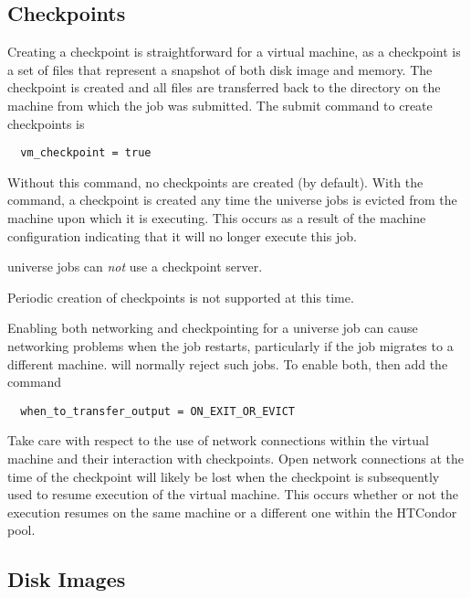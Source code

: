 \subsection{\label{sec:vm-checkpoints}Checkpoints}

Creating a checkpoint is straightforward for a virtual machine,
as a checkpoint is a set of files that represent
a snapshot of both disk image and memory.
The checkpoint is created and all files are transferred back
to the  directory on the machine from which
the job was submitted.
The submit command to create checkpoints is
\begin{verbatim}
  vm_checkpoint = true
\end{verbatim}
Without this command, no checkpoints are created (by default).
With the command, a checkpoint is created any time the 
universe jobs is evicted from the machine upon which it is executing.
This occurs as a result of the machine configuration indicating
that it will no longer execute this job.

 universe jobs can \emph{not} use a checkpoint server.

Periodic creation of checkpoints is not supported at this time.

Enabling both networking and checkpointing for a 
universe job can cause networking problems when the job restarts,
particularly if the job migrates to a different machine.
 will normally reject such jobs.
To enable both, then add the command
\begin{verbatim}
  when_to_transfer_output = ON_EXIT_OR_EVICT
\end{verbatim}

Take care with respect to the use of network connections within
the virtual machine and their interaction with checkpoints.
Open network connections at the time of the checkpoint will likely
be lost when the checkpoint is subsequently used to resume execution
of the virtual machine.
This occurs whether or not the execution resumes
on the same machine or a different one within the HTCondor pool.   

\subsection{\label{sec:vm-disk-image-details}Disk Images}

